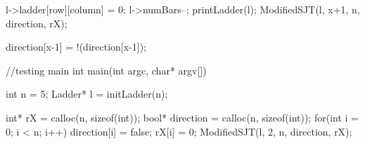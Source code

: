 \begin{singlespace}
\begin{footnotesize}
\begin{code}
{{{{				l->ladder[row][column] = 0;
				l->numBars--;	
			}
			printLadder(l);
			ModifiedSJT(l, x+1, n, direction, rX);


		}
	}
	direction[x-1] = !(direction[x-1]);
}


//testing main
int main(int argc, char* argv[])
{
  
    int n = 5;
    Ladder* l = initLadder(n);
   

	int* rX = calloc(n, sizeof(int));
	bool* direction = calloc(n, sizeof(int));
	for(int i = 0; i < n; i++){
		direction[i] = false;
		rX[i] = 0;
	}
	ModifiedSJT(l, 2, n, direction, rX);
}




\end{code}
\end{footnotesize}
\end{singlespace}




